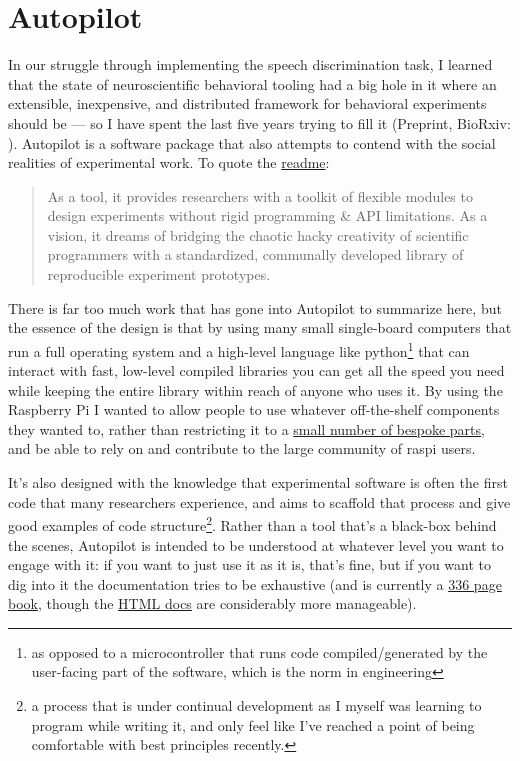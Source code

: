 \section{Autopilot}
\label{sec:autopilot}
 
In our struggle through implementing the speech discrimination task, I learned that the state of neuroscientific behavioral tooling had a big hole in it where an extensible, inexpensive, and distributed framework for behavioral experiments should be --- so I have spent the last five years trying to fill it (Preprint, BioRxiv: \cite{saundersAutopilotAutomatingBehavioral2019}). Autopilot is a software package that also attempts to contend with the social realities of experimental work. To quote the \href{https://github.com/wehr-lab/autopilot/blob/main/README.md}{readme}:

\begin{quote}
As a tool, it provides researchers with a toolkit of flexible modules to design experiments without rigid programming \& API limitations. As a vision, it dreams of bridging the chaotic hacky creativity of scientific programmers with a standardized, communally developed library of reproducible experiment prototypes.
\end{quote}


There is far too much work that has gone into Autopilot to summarize here, but the essence of the design is that by using many small single-board computers that run a full operating system and a high-level language like python\footnote{as opposed to a microcontroller that runs code compiled/generated by the user-facing part of the software, which is the norm in engineering} that can interact with fast, low-level compiled libraries you can get all the speed you need while keeping the entire library within reach of anyone who uses it. By using the Raspberry Pi I wanted to allow people to use whatever off-the-shelf components they wanted to, rather than restricting it to a \href{https://sanworks.io/shop/products.php?productFamily=bpod}{small number of bespoke parts}, and be able to rely on and contribute to the large community of raspi users.

It's also designed with the knowledge that experimental software is often the first code that many researchers experience, and aims to scaffold that process and give good examples of code structure\footnote{a process that is under continual development as I myself was learning to program while writing it, and only feel like I've reached a point of being comfortable with best principles recently.}. Rather than a tool that's a black-box behind the scenes, Autopilot is intended to be understood at whatever level you want to engage with it: if you want to just use it as it is, that's fine, but if you want to dig into it the documentation tries to be exhaustive (and is currently a \href{https://docs.auto-pi-lot.com/_/downloads/en/latest/pdf/}{336 page book}, though the \href{https://docs.auto-pi-lot.com/en/latest/}{HTML docs} are considerably more manageable).

